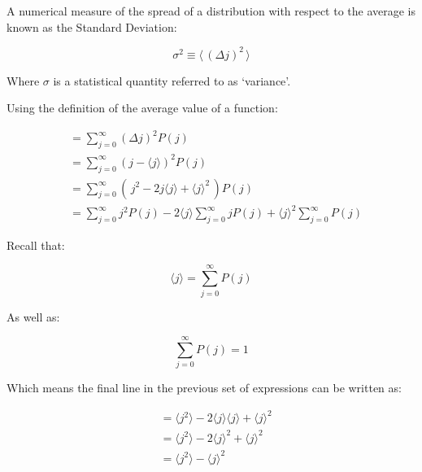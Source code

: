 A numerical measure of the spread of a distribution with respect to the average is known as the Standard Deviation:

\[
    \sigma^{2} \equiv \langle \, (\Delta j)^{2} \, \rangle
\]

Where $\sigma$ is a statistical quantity referred to as `variance'.

Using the definition of the average value of a function:

\begin{align*}
    &= \sum_{j=0}^{\infty} (\Delta j)^{2} P(j) \\[1.5ex]
    &= \sum_{j=0}^{\infty} (j - \langle j \rangle)^{2} P(j) \\[1.5ex]
    &= \sum_{j=0}^{\infty} (\,j^{2} - 2j \langle j \rangle + \langle j \rangle^{2}\,) P(j) \\[1.5ex]
    &= \sum_{j=0}^{\infty} j^2 P(j) - 2 \langle j \rangle \sum_{j=0}^{\infty} jP(j)
       + \langle j \rangle^{2} \sum_{j=0}^{\infty} P(j)
\end{align*}

Recall that:

\[
    \langle j \rangle = \sum_{j=0}^{\infty} P(j)
\]

As well as:

\[
    \sum_{j=0}^{\infty} P(j) = 1
\]

Which means the final line in the previous set of expressions can be written as:

\begin{align*}
    &= \langle j^{2} \rangle - 2 \langle j \rangle \langle j \rangle + \langle j \rangle^{2} \\[1.5ex]
    &= \langle j^{2} \rangle - 2 \langle j \rangle^{2} + \langle j \rangle^{2} \\[1.5ex]
    &= \boxed{\langle j^{2} \rangle - \langle j \rangle^{2}}
\end{align*}